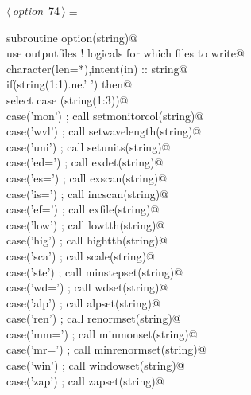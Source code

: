 \documentclass[10pt,a4paper,notitlepage]{article}
\begin{document}
\begin{flushleft} \small
\begin{minipage}{\linewidth}\label{scrap83}\raggedright\small
{} $\langle\,${\it option}\nobreak\ {\footnotesize {74}}$\,\rangle\equiv$
\vspace{-1ex}
\begin{list}{}{} \item
\mbox{}\verb@      subroutine option(string)@\\
\mbox{}\verb@      use outputfiles ! logicals for which files to write@\\
\mbox{}\verb@      character(len=*),intent(in) :: string@\\
\mbox{}\verb@      if(string(1:1).ne.' ') then@\\
\mbox{}\verb@       select case (string(1:3))@\\
\mbox{}\verb@        case('mon') ; call setmonitorcol(string)@\\
\mbox{}\verb@        case('wvl') ; call setwavelength(string)@\\
\mbox{}\verb@        case('uni') ; call setunits(string)@\\
\mbox{}\verb@        case('ed=') ; call exdet(string)@\\
\mbox{}\verb@        case('es=') ; call exscan(string)@\\
\mbox{}\verb@        case('is=') ; call incscan(string)@\\
\mbox{}\verb@        case('ef=') ; call exfile(string)@\\
\mbox{}\verb@        case('low') ; call lowtth(string)@\\
\mbox{}\verb@        case('hig') ; call hightth(string)@\\
\mbox{}\verb@        case('sca') ; call scale(string)@\\
\mbox{}\verb@        case('ste') ; call minstepset(string)@\\
\mbox{}\verb@        case('wd=') ; call wdset(string)@\\
\mbox{}\verb@        case('alp') ; call alpset(string)@\\
\mbox{}\verb@        case('ren') ; call renormset(string)@\\
\mbox{}\verb@        case('mm=') ; call minmonset(string)@\\
\mbox{}\verb@        case('mr=') ; call minrenormset(string)@\\
\mbox{}\verb@        case('win') ; call windowset(string)@\\
\mbox{}\verb@        case('zap') ; call zapset(string)@\\

\end{list}
\end{minipage}
\end{flushleft}
\end{document}
